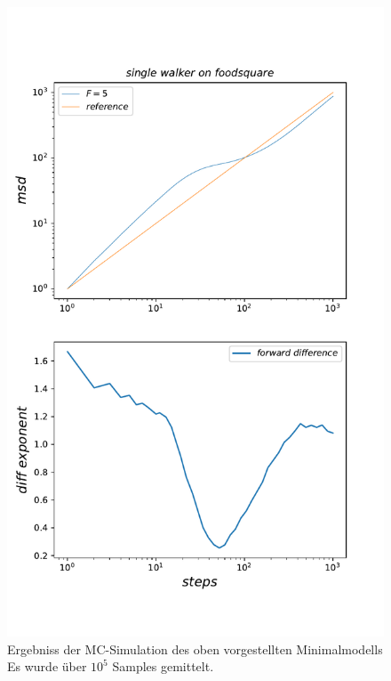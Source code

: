 \documentclass[a4paper, 12pt]{report}
\begin{document}
\begin{figure}[H]
	\centering
	\includegraphics[scale=0.75]{single_walker_on20x20.pdf}
	\caption{Ergebniss der MC-Simulation des oben vorgestellten Minimalmodells \break Es wurde über $10^5$ Samples gemittelt.}
\end{figure}
\end{document}
